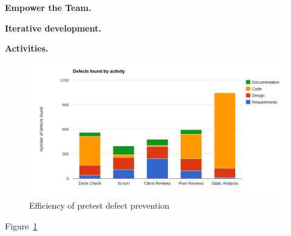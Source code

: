 \textbf{Empower the Team.}




\textbf{Iterative development.}

\textbf{Activities.}

\begin{figure}[t]
\begin{center}
\includegraphics[width=1.0\textwidth]{image/pretest-efficiency.png}
\end{center}
\caption{Efficiency of pretest defect prevention}
\label{fig:pretest-efficiency}
\end{figure}

Figure~\ref{fig:pretest-efficiency}


 
 


